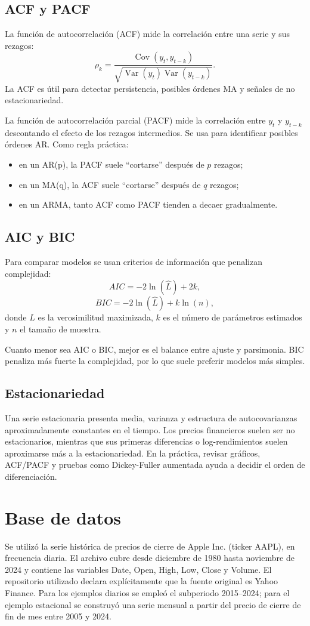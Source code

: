 \documentclass[12pt,a4paper]{article}
\begin{document}
\subsection{ACF y PACF}
La función de autocorrelación (ACF) mide la correlación entre una serie y sus rezagos:
\[
\rho_k = \frac{\operatorname{Cov}(y_t,y_{t-k})}{\sqrt{\operatorname{Var}(y_t)\operatorname{Var}(y_{t-k})}}.
\]
La ACF es útil para detectar persistencia, posibles órdenes MA y señales de no estacionariedad.

La función de autocorrelación parcial (PACF) mide la correlación entre $y_t$ y $y_{t-k}$ descontando el efecto de los rezagos intermedios. Se usa para identificar posibles órdenes AR. Como regla práctica:
\begin{itemize}
    \item en un AR(p), la PACF suele ``cortarse'' después de $p$ rezagos;
    \item en un MA(q), la ACF suele ``cortarse'' después de $q$ rezagos;
    \item en un ARMA, tanto ACF como PACF tienden a decaer gradualmente.
\end{itemize}

\subsection{AIC y BIC}
Para comparar modelos se usan criterios de información que penalizan complejidad:
\[
AIC = -2\ln(\hat L) + 2k,
\]
\[
BIC = -2\ln(\hat L) + k\ln(n),
\]
donde $\hat L$ es la verosimilitud maximizada, $k$ es el número de parámetros estimados y $n$ el tamaño de muestra.

Cuanto menor sea AIC o BIC, mejor es el balance entre ajuste y parsimonia. BIC penaliza más fuerte la complejidad, por lo que suele preferir modelos más simples.

\subsection{Estacionariedad}
Una serie estacionaria presenta media, varianza y estructura de autocovarianzas aproximadamente constantes en el tiempo. Los precios financieros suelen ser no estacionarios, mientras que sus primeras diferencias o log-rendimientos suelen aproximarse más a la estacionariedad. En la práctica, revisar gráficos, ACF/PACF y pruebas como Dickey-Fuller aumentada ayuda a decidir el orden de diferenciación.

\section{Base de datos}
Se utilizó la serie histórica de precios de cierre de Apple Inc. (ticker AAPL), en frecuencia diaria. El archivo cubre desde diciembre de 1980 hasta noviembre de 2024 y contiene las variables Date, Open, High, Low, Close y Volume. El repositorio utilizado declara explícitamente que la fuente original es Yahoo Finance. Para los ejemplos diarios se empleó el subperiodo 2015--2024; para el ejemplo estacional se construyó una serie mensual a partir del precio de cierre de fin de mes entre 2005 y 2024.
\end{document}

